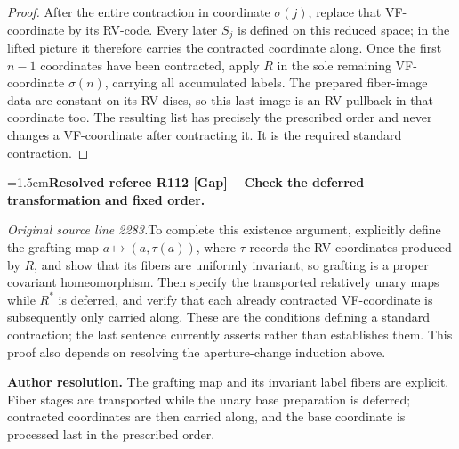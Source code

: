 \documentclass[12pt]{amsart}
\newcommand{\ResolvedRefereeRemark}[5]{%
  \par\medskip\begingroup\normalfont\small\color{gray}%
  \emergencystretch=1.5em\noindent\textbf{Resolved referee R#1 [#2] -- #3.}\par\nobreak\noindent #4\par
  \medskip\color{ResolutionGreen}\noindent\textbf{Author resolution.} #5\par
  \endgroup\medskip
}
\theoremstyle{plain}
\theoremstyle{definition}
\theoremstyle{remark}
\numberwithin{equation}{section}
\theoremstyle{plain}
\newcommand{\0}{\emptyset}
\begin{document}
\begin{proof}
After the entire contraction in coordinate $\sigma(j)$, replace that VF-coordinate by its RV-code. Every later $S_j$ is defined on this reduced space; in the lifted picture it therefore carries the contracted coordinate along. Once the first $n-1$ coordinates have been contracted, apply $R$ in the sole remaining VF-coordinate $\sigma(n)$, carrying all accumulated labels. The prepared fiber-image data are constant on its RV-discs, so this last image is an RV-pullback in that coordinate too. The resulting list has precisely the prescribed order and never changes a VF-coordinate after contracting it. It is the required standard contraction.
\end{proof}

\ResolvedRefereeRemark{112}{Gap}{Check the deferred transformation and fixed order}{%
\textit{Original source line 2283.}\quad To complete this existence argument, explicitly define the grafting map $a\mapsto(a,\tau(a))$, where $\tau$ records the RV-coordinates produced by $R$, and show that its fibers are uniformly invariant, so grafting is a proper covariant homeomorphism. Then specify the transported relatively unary maps while $R^*$ is deferred, and verify that each already contracted VF-coordinate is subsequently only carried along. These are the conditions defining a standard contraction; the last sentence currently asserts rather than establishes them. This proof also depends on resolving the aperture-change induction above.
}{The grafting map and its invariant label fibers are explicit. Fiber stages are transported while the unary base preparation is deferred; contracted coordinates are then carried along, and the base coordinate is processed last in the prescribed order.}
\end{document}
